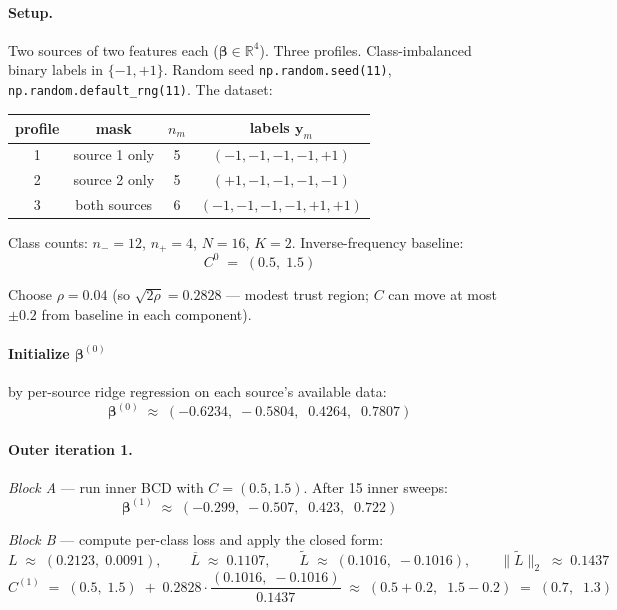 \documentclass[11pt,a4paper]{article}
\begin{document}
\paragraph{Setup.} Two sources of two features each ($\boldsymbol{\beta} \in \mathbb{R}^4$). Three profiles. Class-imbalanced binary labels in $\{-1, +1\}$. Random seed \texttt{np.random.seed(11)}, \texttt{np.random.default\_rng(11)}. The dataset:

\begin{center}
\begin{tabular}{cccc}
\toprule
profile & mask & $n_m$ & labels $\mathbf{y}_m$ \\
\midrule
1 & source 1 only & 5 & $(-1, -1, -1, -1, +1)$ \\
2 & source 2 only & 5 & $(+1, -1, -1, -1, -1)$ \\
3 & both sources & 6 & $(-1, -1, -1, -1, +1, +1)$ \\
\bottomrule
\end{tabular}
\end{center}

Class counts: $n_- = 12$, $n_+ = 4$, $N = 16$, $K = 2$. Inverse-frequency baseline:
\[
C^{0} \;=\; (0.5,\;1.5)
\]

Choose $\rho = 0.04$ (so $\sqrt{2\rho} = 0.2828$ --- modest trust region; $C$ can move at most $\pm 0.2$ from baseline in each component).

\paragraph{Initialize $\boldsymbol{\beta}^{(0)}$} by per-source ridge regression on each source's available data:
\[
\boldsymbol{\beta}^{(0)} \;\approx\; (-0.6234,\;-0.5804,\;\;0.4264,\;\;0.7807)
\]

\paragraph{Outer iteration 1.}

\emph{Block A} --- run inner BCD with $C = (0.5, 1.5)$. After 15 inner sweeps:
\[
\boldsymbol{\beta}^{(1)} \;\approx\; (-0.299,\;-0.507,\;\;0.423,\;\;0.722)
\]

\emph{Block B} --- compute per-class loss and apply the closed form:
\[
L \;\approx\; (0.2123,\;0.0091),\qquad \overline{L} \;\approx\; 0.1107,\qquad \widetilde{L} \;\approx\; (0.1016,\;-0.1016),\qquad \|\widetilde{L}\|_{2} \;\approx\; 0.1437
\]
\[
C^{(1)} \;=\; (0.5,\;1.5) \;+\; 0.2828 \cdot \frac{(0.1016,\;-0.1016)}{0.1437} \;\approx\; (0.5 + 0.2,\;\;1.5 - 0.2) \;=\; (0.7,\;\;1.3)
\]
\end{document}
